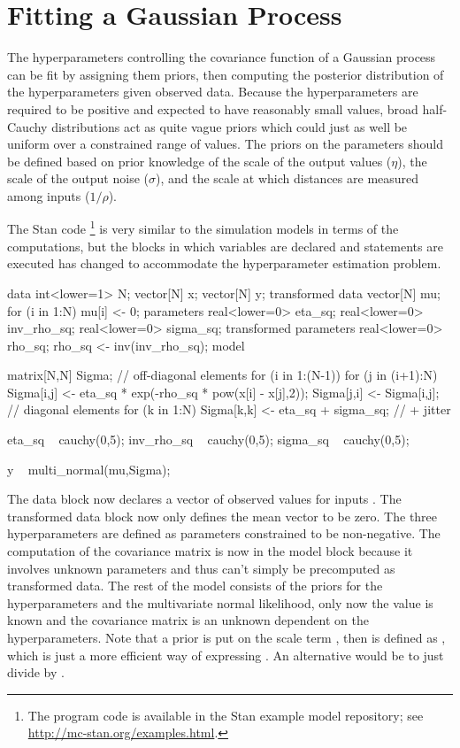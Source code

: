 \section{Fitting a Gaussian Process}\label{fit-gp.section}

The hyperparameters controlling the covariance function of a Gaussian
process can be fit by assigning them priors, then computing the
posterior distribution of the hyperparameters given observed data.
Because the hyperparameters are required to be positive and expected
to have reasonably small values, broad half-Cauchy distributions act
as quite vague priors which could just as well be uniform over a
constrained range of values.  The priors on the parameters should be
defined based on prior knowledge of the scale of the output values
($\eta$), the scale of the output noise ($\sigma$), and the scale at
which distances are measured among inputs ($1/\rho$).

The Stan code%
%
\footnote{The program code is available in the Stan example model repository;
see \url{http://mc-stan.org/examples.html}.}
%
is very similar to the simulation models in terms of the
computations, but the blocks in which variables are declared and
statements are executed has changed to accommodate the hyperparameter
estimation problem.
%
\begin{stancode}
data {
  int<lower=1> N;
  vector[N] x;
  vector[N] y;
}
transformed data {
  vector[N] mu;
  for (i in 1:N) mu[i] <- 0;
}
parameters {
  real<lower=0> eta_sq;
  real<lower=0> inv_rho_sq;
  real<lower=0> sigma_sq;
}
transformed parameters {
  real<lower=0> rho_sq;
  rho_sq <- inv(inv_rho_sq);
}
model {
  matrix[N,N] Sigma;
  // off-diagonal elements
  for (i in 1:(N-1)) {
    for (j in (i+1):N) {
      Sigma[i,j] <- eta_sq * exp(-rho_sq * pow(x[i] - x[j],2));
      Sigma[j,i] <- Sigma[i,j];
    }
  }
  // diagonal elements
  for (k in 1:N)
    Sigma[k,k] <- eta_sq + sigma_sq;  // + jitter

  eta_sq ~ cauchy(0,5);
  inv_rho_sq ~ cauchy(0,5);
  sigma_sq ~ cauchy(0,5);

  y ~ multi_normal(mu,Sigma);
}
\end{stancode}
%
The data block now declares a vector  of observed values
 for inputs .  The transformed data block now
only defines the mean vector to be zero.  The three hyperparameters
are defined as parameters constrained to be non-negative.  The
computation of the covariance matrix  is now in the model
block because it involves unknown parameters and thus can't simply be
precomputed as transformed data.  The rest of the model consists of
the priors for the hyperparameters and the multivariate
normal likelihood, only now the value  is known and the
covariance matrix  is an unknown dependent on the
hyperparameters.  Note that a prior is put on the scale term
, then  is defined as
, which is just a more efficient way of
expressing .  An alternative would be to just divide
by .

